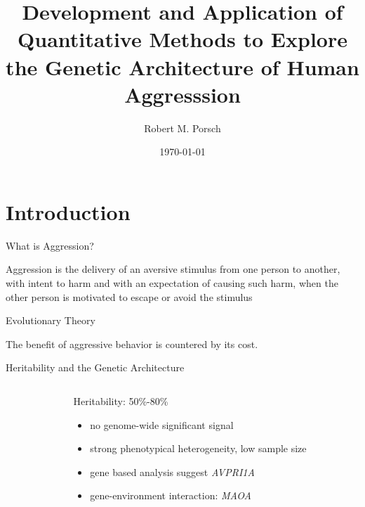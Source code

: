 \documentclass{beamer}
\title{Development and Application of Quantitative Methods to Explore the Genetic Architecture of Human Aggresssion}
\date{\today}
\author{Robert M. Porsch}
\institute{Department of Psychiatry}
\begin{document}
  \maketitle
	\tableofcontents

  \section{Introduction}

  \begin{frame}{What is Aggression?}
    \begin{center}
      \begin{displayquote}
      Aggression is the delivery of an aversive stimulus from one person to another, with intent to harm and with an expectation of causing such harm, when the other person is motivated to escape or avoid the stimulus
    \end{displayquote}
    \end{center}
  \end{frame}

  \begin{frame}[t]{Evolutionary Theory}
    \begin{center}
      \scalebox{0.7}{}
      The benefit of aggressive behavior is countered by its cost.
    \end{center}
  \end{frame}

  \begin{frame}[t]{Heritability and the Genetic Architecture}
    \begin{columns}
      \begin{column}{0.3\textwidth}
        \scalebox{0.5}{}
        \scalebox{0.5}{}
      \end{column}
      \begin{column}{0.7\textwidth}
        \begin{center}
          Heritability: 50\%-80\%~\cite{Porsch2016}
        \end{center}
        \begin{itemize}
          \item no genome-wide significant signal~\cite{Vassos2014}
          \item strong phenotypical heterogeneity, low sample size 
          \item gene based analysis suggest \textit{AVPRI1A} 
          \item gene-environment interaction: \textit{MAOA}
        \end{itemize}
      \end{column}
    \end{columns}
    
  \end{frame}
\end{document}
